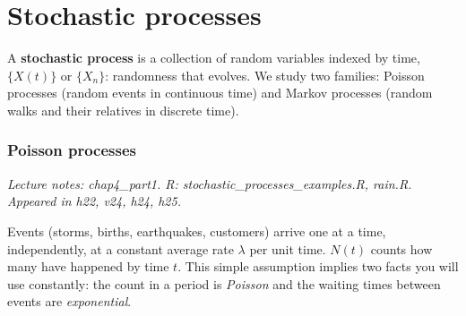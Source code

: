 \part{Stochastic processes}

A \textbf{stochastic process} is a collection of random variables indexed by time, $\{X(t)\}$ or $\{X_n\}$: randomness that evolves. We study two families: Poisson processes (random events in continuous time) and Markov processes (random walks and their relatives in discrete time).

\section{Poisson processes}
\textit{Lecture notes: chap4\_part1. R: stochastic\_processes\_examples.R, rain.R. Appeared in h22, v24, h24, h25.}

\begin{idea}
Events (storms, births, earthquakes, customers) arrive one at a time, independently, at a constant average rate $\lambda$ per unit time. $N(t)$ counts how many have happened by time $t$. This simple assumption implies two facts you will use constantly: the count in a period is \emph{Poisson} and the waiting times between events are \emph{exponential}.
\end{idea}

